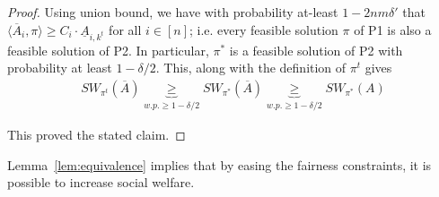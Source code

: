 \begin{proof}
Using union bound, we have  with probability at-least $1 - 2nm\delta'$ that $\langle \overline{A}_i,  \pi \rangle \geq  C_i \cdot \underline{A}_{i,k^t} $ for all $i\in [n]$; i.e.   every  feasible solution $\pi$ of P1 is also a feasible solution of P2. In particular, $\pi^*$ is a feasible solution of P2 with probability at least $1 - \delta/2$. This, along with the definition of $\pi^t$  gives 
\begin{align*}
SW_{\pi^t} (\overline{A}) \underbrace{\geq}_{w.p. \geq 1- \delta/2 }  SW_{\pi^*} (\overline{A}) \underbrace{\geq}_{w.p. \geq 1- \delta/2 } SW_{\pi^*} (A)
\end{align*}

This proved the stated claim.   
\end{proof}
 Lemma~\ref{lem:equivalence} implies that by easing the fairness constraints, it is possible to increase social welfare.  %
\iffalse 
\begin{proof}
 We prove the stated claim by showing that with probability at least $1-\delta$, every feasible policy $\pi$ of P1 is a feasible policy of P2. That is $  A_i^T \pi \geq c \cdot \Amax_i$ for all $i\in [n]$. 
 
 Fix $i \in [n]$. Let $k := \arg\max_{j \in [m]} A_{i,j}$ and $ k^t :=  \arg\max_{j \in [m]} \underline{A}_{i,j}^t $. 
 
 Let $\delta_0 = \delta/m$. Then using Hoeffding's Inequality (Eq~\toref) with  $\varepsilon_{i,j}^t = \sqrt{\frac{\log(m n /\delta_0)}{2N_{j,t}}}$, we have  with probability at-least $1 - \frac{\delta_0}{mn}$ that 
\begin{align*}
\widehat{A}_{i,j} - A_{i,j} & \geq - \varepsilon_{i,j}^t 
 \end{align*}
 Using union bound, we have with probability at least $1 - \delta/n$ 
\begin{equation}
 \sum_{j =1}^m ( \widehat{A}_{i,j} - A_{i,j}    +  \varepsilon_{i,j}^t ) \pi_j  \geq 0   
 \implies \overline{A}_i^T \pi  \geq A_i^T \pi    
\end{equation}
We have   
\[  \langle \overline{A}_i,  \pi \rangle  \geq \langle  A_i, \pi  \rangle     \geq  c . A_{i,k} \geq c.  A_{i, k^t}     \geq c.(\widehat{A}_{i,k^t} - \varepsilon_{k^t}^t) = c. \underline{A}_{i,k^t}  \] 
The second inequality follows from the feasibility of $\pi$ for P1, the third inequality follows from the definition of $k_i$, and the last inequality follows from Hoeffding's inequality. The first and last inequalities each hold with probability at least $(1-\delta)$. Applying union bound, we conclude the proof of the lemma.   
\end{proof}
 \fi 



